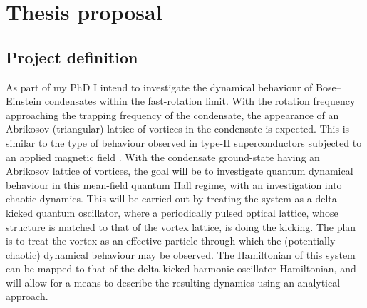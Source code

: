 \section{Thesis proposal}\label{sec:prelim}

\subsection{Project definition}
As part of my PhD I intend to investigate the dynamical behaviour of Bose--Einstein condensates within the fast-rotation limit. With the rotation frequency approaching the trapping frequency of the condensate, the appearance of an Abrikosov (triangular) lattice of vortices in the condensate is expected. This is similar to the type of behaviour observed in type-II superconductors subjected to an applied magnetic field \cite{QM:Abrikosov_jpcs_1957}. With the condensate ground-state having an Abrikosov lattice of vortices, the goal will be to investigate quantum dynamical behaviour in this mean-field quantum Hall regime, with an investigation into chaotic dynamics. This will be carried out by treating the system as a delta-kicked quantum oscillator, where a periodically pulsed optical lattice, whose structure is matched to that of the vortex lattice, is doing the kicking. The plan is to treat the vortex as an effective particle through which the (potentially chaotic) dynamical behaviour may be observed. The Hamiltonian of this system can be mapped to that of the delta-kicked harmonic oscillator Hamiltonian, and will allow for a means to describe the resulting dynamics using an analytical  approach.
